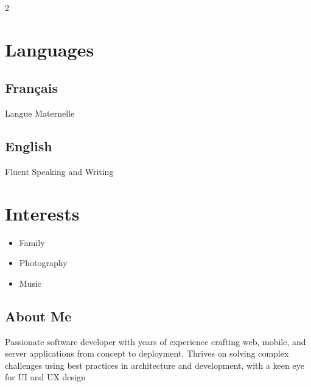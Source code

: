 \documentclass{article}
\begin{document}
\begin{paracol}{2}
\begin{leftcolumn}
    \section{Languages}

    \subsection{Français}
    Langue Maternelle

    \vspace{0.5em}

    \subsection{English}
    Fluent Speaking and Writing

    \section{Interests}

    \begin{itemize}
      \item Family
      \item Photography
      \item Music
    \end{itemize}


  \end{leftcolumn}
  \begin{rightcolumn}

    \vspace{-2.5em}
    \section{About Me}

    Passionate software developer with  years of experience
    crafting web, mobile, and server applications from concept to deployment. Thrives
    on solving complex challenges using best practices in architecture and development,
    with a keen eye for UI and UX design


\end{rightcolumn}
\end{paracol}
\end{document}
